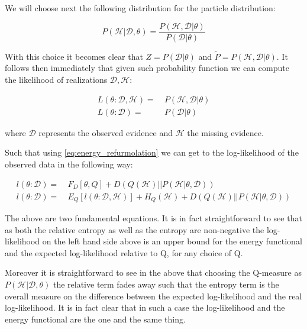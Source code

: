\documentclass[11pt]{article}
\begin{document}
\begin{article}
We will choose next the following distribution for the particle
distribution:

\begin{equation} \label{eq:particle_distribution}
P (\mathscr{H} | \mathscr{D}, \theta) =   \frac{P (\mathscr{H}, \mathscr{D}| \theta)}{P (\mathscr{D}| \theta)}
\end{equation}

With this choice it becomes clear that \(Z = P (\mathscr{D}|
   \theta)\) and \(\tilde{P} = P (\mathscr{H}, \mathscr{D}| \theta)\). It
follows then immediately that given such probability function we
can compute the likelihood of realizations \(\mathscr{D}, \mathscr{H}\):

\begin{align} \label{eq:likelihood_particle}
L (\theta: \mathscr{D}, \mathscr{H}) =& \  P (\mathscr{H}, \mathscr{D}| \theta)\\
L (\theta: \mathscr{D}) =& \ P (\mathscr{D}| \theta)
\end{align}

where \(\mathscr{D}\) represents the observed evidence and
\(\mathscr{H}\) the missing evidence.

Such that using \ref{eq:energy_refurmolation} we can get to the
log-likelihood of the observed data in the following way:

\begin{align} \label{eq:likelihood_energy_functional_relation}
l (\theta: \mathscr{D}) =& \  F_D[\theta, Q] + D (Q (\mathscr{H}) || P (\mathscr{H}| \theta, \mathscr{D})) \\
l (\theta: \mathscr{D}) =& \  E_Q[l (\theta: \mathscr{D}, \mathscr{H})]+ H_Q (\mathscr {H}) + D (Q (\mathscr{H}) || P (\mathscr{H}| \theta, \mathscr{D}))
\end{align}

The above are two fundamental equations. It is in fact
straightforward to see that as both the relative entropy as well as
the entropy are non-negative the log-likelihood on the left hand
side above is an upper bound for the energy functional and the expected
log-likelihood relative to Q, for any choice of Q.

Moreover it is straightforward to see in the above that choosing the
Q-measure as \(P (\mathscr{H}| \mathscr{D}, \theta)\) the relative term
fades away such that the entropy term is the overall measure on the
difference between the expected log-likelihood and the real
log-likelihood. It is in fact clear that in such a case the
log-likelihood and the energy functional are the one and the same
thing.


\end{article}
\end{document}

